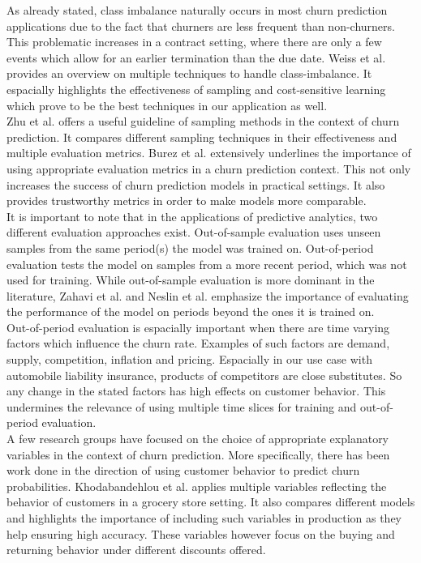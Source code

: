 \documentclass[12pt,titlepage]{article}
\begin{document}
As already stated, class imbalance naturally occurs in most churn prediction applications due to the fact that churners are less frequent than non-churners. This problematic increases in a contract setting, where there are only a few events which allow for an earlier termination than the due date. Weiss et al. \cite{mining_rarity} provides an overview on multiple techniques to handle class-imbalance. It espacially highlights the effectiveness of sampling and cost-sensitive learning which prove to be the best techniques in our application as well. \\
Zhu et al. \cite{zhu} offers a useful guideline of sampling methods in the context of churn prediction. It compares different sampling techniques in their effectiveness and multiple evaluation metrics. Burez et al. \cite{burez} extensively underlines the importance of using appropriate evaluation metrics in a churn prediction context. This not only increases the success of churn prediction models in practical settings. It also provides trustworthy metrics in order to make models more comparable. \\
It is important to note that in the applications of predictive analytics, two different evaluation approaches exist. Out-of-sample evaluation uses unseen samples from the same period(s) the model was trained on. Out-of-period evaluation tests the model on samples from a more recent period, which was not used for training. While out-of-sample evaluation is more dominant in the literature, Zahavi et al. \cite{zahavi} and Neslin et al. \cite{neslin} emphasize the importance of evaluating the performance of the model on periods beyond the ones it is trained on. \\
Out-of-period evaluation is espacially important when there are time varying factors which influence the churn rate. Examples of such factors are demand, supply, competition, inflation and pricing. Espacially in our use case with automobile liability insurance, products of competitors are close substitutes. So any change in the stated factors has high effects on customer behavior. This undermines the relevance of using multiple time slices for training and out-of-period evaluation. \\
A few research groups have focused on the choice of appropriate explanatory variables in the context of churn prediction. More specifically, there has been work done in the direction of using customer behavior to predict churn probabilities. Khodabandehlou et al. \cite{khodabandehlou} applies multiple variables reflecting the behavior of customers in a grocery store setting. It also compares different models and highlights the importance of including such variables in production as they help ensuring high accuracy. These variables however focus on the buying and returning behavior under different discounts offered. \\
\end{document}
